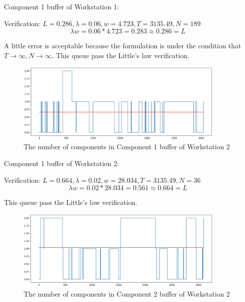 \documentclass{article}
\begin{document}
Component 1 buffer of Workstation 1:

Verification: $L = 0.286, \lambda = 0.06, w = 4.723, T = 3135.49, N = 189$
\begin{equation}
\lambda w = 0.06*4.723 = 0.283 \approx 0.286 = L
\end{equation}

A little error is acceptable because the formulation is under the condition that $T \rightarrow \infty, N \rightarrow \infty$. This queue pass the Little's law verification.

\begin{figure}[htbp]
\begin{center}
\includegraphics[width=4in]{W2_C1B.png}
\caption{The number of components in Component 1 buffer of Workstation 2}
\label{W2_C1B}
\end{center}
\end{figure}

Component 1 buffer of Workstation 2:

Verification: $L = 0.664, \lambda = 0.02, w = 28.034, T = 3135.49, N = 36$
\begin{equation}
\lambda w = 0.02*28.034 = 0.561 \approx 0.664 = L
\end{equation}

This queue pass the Little's law verification.

\begin{figure}[htbp]
\begin{center}
\includegraphics[width=4in]{W2_C2B.png}
\caption{The number of components in Component 2 buffer of Workstation 2}
\label{W2_C2B}
\end{center}
\end{figure}
\end{document}
